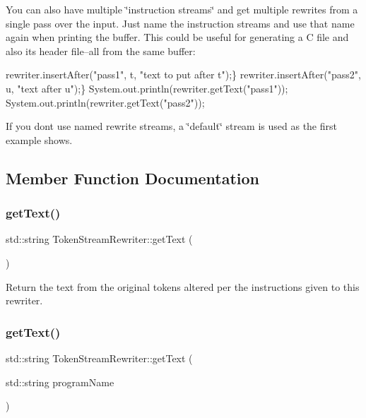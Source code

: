 You can also have multiple \char`\"{}instruction streams\char`\"{} and get multiple rewrites from a single pass over the input. Just name the instruction streams and use that name again when printing the buffer. This could be useful for generating a C file and also its header file--all from the same buffer\+:


\begin{DoxyPre}
rewriter.insertAfter("pass1", t, "text to put after t");\}
rewriter.insertAfter("pass2", u, "text after u");\}
System.out.println(rewriter.getText("pass1"));
System.out.println(rewriter.getText("pass2"));
\end{DoxyPre}


If you don\textquotesingle{}t use named rewrite streams, a \char`\"{}default\char`\"{} stream is used as the first example shows.

\subsection{Member Function Documentation}
\mbox{\label{classantlr4_1_1TokenStreamRewriter_a4c8eb9cc4661e42941c90278caa6fd29}} 
\subsubsection{\texorpdfstring{get\+Text()}{getText()}\hspace{0.1cm}{\footnotesize\ttfamily [1/3]}}
{\footnotesize\ttfamily std\+::string Token\+Stream\+Rewriter\+::get\+Text (\begin{DoxyParamCaption}{ }\end{DoxyParamCaption})\hspace{0.3cm}{\ttfamily [virtual]}}

Return the text from the original tokens altered per the instructions given to this rewriter. \mbox{\label{classantlr4_1_1TokenStreamRewriter_a9891307cfb3f923da031a292965b7cf2}} 
\subsubsection{\texorpdfstring{get\+Text()}{getText()}\hspace{0.1cm}{\footnotesize\ttfamily [2/3]}}
{\footnotesize\ttfamily std\+::string Token\+Stream\+Rewriter\+::get\+Text (\begin{DoxyParamCaption}\item[{std\+::string}]{program\+Name }\end{DoxyParamCaption})}

